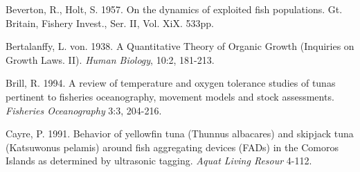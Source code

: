 


\begin{thebibliography}{}


 Beverton, R., Holt, S. 1957. On the dynamics of exploited fish populations. Gt. Britain, Fishery Invest., Ser. II, Vol. XiX. 533pp.





 Bertalanffy, L. von. 1938. A Quantitative Theory of Organic Growth (Inquiries on Growth Laws. II). \textit{Human Biology}, 10:2, 181-213.


 Brill, R. 1994. A review of temperature and oxygen tolerance studies of tunas pertinent to fisheries oceanography, movement models and stock assessments. \textit {Fisheries Oceanography} 3:3, 204-216.

 Cayre, P. 1991. Behavior of yellowfin tuna (Thunnus albacares) and skipjack tuna (Katsuwonus pelamis) around fish aggregating devices (FADs) in the Comoros Islands as determined by ultrasonic tagging. \textit{Aquat Living Resour} 4-112.


\end{thebibliography}

